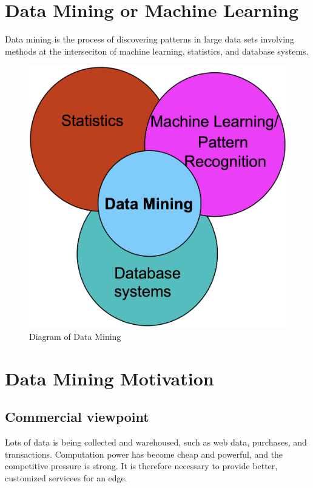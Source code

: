 \section{Data Mining or Machine Learning}

Data mining is the process of discovering patterns in large data sets involving methods at the interseciton of machine learning, statistics, and database systems.
\begin{figure}[H]
    \centering
    \includegraphics[scale=0.2]{figures/datamining.png}
    \caption{Diagram of Data Mining}
\end{figure}


\section{Data Mining Motivation}

\subsection{Commercial viewpoint}
Lots of data is being collected and warehoused, such as web data, purchases, and transactions.
Computation power has become cheap and powerful, and the competitive pressure is strong.
It is therefore necessary to provide better, customized servicees for an edge.

